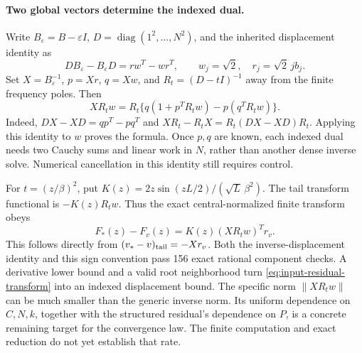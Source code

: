 \paragraph{Two global vectors determine the indexed dual.}
Write $B_\varepsilon=B-\varepsilon I$, $D=\operatorname{diag}(1^2,\ldots,N^2)$,
and the inherited displacement identity as
\[
 DB_\varepsilon-B_\varepsilon D=rw^T-wr^T,\qquad
 w_j=\sqrt2,\quad r_j=\sqrt2\,j b_j.
\]
Set $X=B_\varepsilon^{-1}$, $p=Xr$, $q=Xw$, and
$R_t=(D-tI)^{-1}$ away from the finite frequency poles. Then
\begin{equation}\label{eq:input-cauchy-dual}
 XR_tw=R_t\{q(1+p^TR_tw)-p(q^TR_tw)\}.
\end{equation}
Indeed, $DX-XD=qp^T-pq^T$ and
$XR_t-R_tX=R_t(DX-XD)R_t$. Applying this identity to $w$ proves the
formula. Once $p,q$ are known, each indexed dual needs two Cauchy sums and
linear work in $N$, rather than another dense inverse solve. Numerical
cancellation in this identity still requires control.

For $t=(z/\beta)^2$, put
$K(z)=2z\sin(zL/2)/(\sqrt L\,\beta^2)$. The tail transform functional
is $-K(z)R_tw$. Thus the exact central-normalized finite transform obeys
\begin{equation}\label{eq:input-residual-transform}
 F_*(z)-F_v(z)=K(z)(XR_tw)^Tr_v.
\end{equation}
This follows directly from
$(v_*-v)_{\rm tail}=-Xr_v$. Both the inverse-displacement identity and
this sign convention pass 156 exact rational component checks.
A derivative lower bound and a valid root neighborhood turn
\eqref{eq:input-residual-transform} into an indexed displacement bound.
The specific norm $\|XR_tw\|$ can be much smaller than the generic inverse
norm. Its uniform dependence on $C,N,k$, together with the structured
residual's dependence on $P$, is a concrete remaining target for the
convergence law. The finite computation and exact reduction do not yet
establish that rate.
